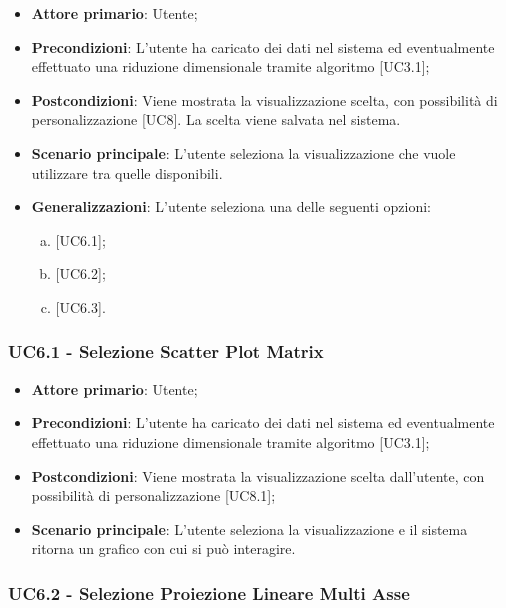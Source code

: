 \begin{itemize}
	\item \textbf{Attore primario}: Utente;
	\item \textbf{Precondizioni}: L'utente ha caricato dei dati nel sistema ed eventualmente effettuato una riduzione dimensionale tramite algoritmo [UC3.1];
	\item \textbf{Postcondizioni}: Viene mostrata la visualizzazione scelta, con possibilità di personalizzazione [UC8]. La scelta viene salvata nel sistema.
	\item \textbf{Scenario principale}: L'utente seleziona la visualizzazione che vuole utilizzare tra quelle disponibili.
	\item \textbf{Generalizzazioni}: L'utente seleziona una delle seguenti opzioni:
		\begin{enumerate}[(a)]
			\item {} [UC6.1];
			\item {} [UC6.2];
			\item {} [UC6.3].
		\end{enumerate}

\end{itemize}

\subsubsection{UC6.1 - Selezione Scatter Plot Matrix}
\begin{itemize}
	\item \textbf{Attore primario}: Utente;
	\item \textbf{Precondizioni}: L'utente ha caricato dei dati nel sistema ed eventualmente effettuato una riduzione dimensionale tramite algoritmo [UC3.1];
	\item \textbf{Postcondizioni}: Viene mostrata la visualizzazione  scelta dall'utente, con possibilità di personalizzazione [UC8.1];
	\item \textbf{Scenario principale}: L'utente seleziona la visualizzazione  e il sistema ritorna un grafico con cui si può interagire.
\end{itemize}

\subsubsection{UC6.2 - Selezione Proiezione Lineare Multi Asse}

